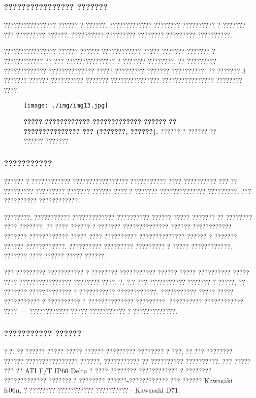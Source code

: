 	\subsubsection {???????????????? ???????}
	
	???????????????? ?????? ? ??????, ????????????? ???????? ?????????? ? ??????? ??? ????????? ??????. ?????????? ????????? ???????? ????????? ??????????.
	
	???????????????? ?????? ?????? ???????????? ????? ??????? ??????? ? ???????????? ?? ??? ??????????????? ? ??????? ????????\cite{makeev}. ?? ????????? ????????????? ?????????????? ????? ????????? ??????? ??????????. ?? ??????? 3 ??????? ?????? ?????????? ??????? ??????????????? ???????????????? ???????? ????.	
	\begin{figure}[ht]
		\centering		 
		\texttt{[image: ./img/img13.jpg]}	
		\caption{
			\textbf{????? ???????????? ????????????? ??????
				?? ??????????????? ??? (???????, ??????).}
			?????? ? ?????? ?? ?????? ???????
		}     
		\label{fig_img13}
	\end{figure}

	\subsubsection{???????????}

	?????? ? ???????????? ????????????????? ??????????? ????
	?????????? ??? ?? ????????? ????????? ??????? ?????? ???? ? ??????? ?????????????? ?????????, ??? ?????????? ????????????.
	
	????????, ??????????? ????????????? ?????????? ?????? ?????
	??????? ?? ???????? ???? ???????. ?? ???? ?????? ? ???????
	?????????????? ?????? ???????????? ??????? ????????????
	????? ???? ?????????? ?????????????? ?????? ? ??????? ??????
	????????????. ?????????? ????????? ????????? ? ????? ????????????, ??????? ???? ?????? ????? ??????.

	??? ????????? ??????????? ? ???????? ??????????? ??????
	????? ?????????? ????? ???? ???????????????? ???????? ????, ?. ?.? 
	??? ??????????? ??????? ? ?????, ?? ??????? ?????????????
	? ??????????? ????????????. ??????????? ????? ????? ??????????? ? ?????????? ? ?????????????? ?????????.
	?????????? ???????????? ????~--- ???????????? ????? ??????????? ? ?????????????.
	
	\newpage
	\subsubsection{??????????? ??????}
	
	?.?. ?? ?????? ????? ????? ?????? ????????? ???????? ? ???, ??
	??? ???????? ?????? ???????????????? ??????, ??????????? ?? ?????????? ??????????. ??? ????? ??? ?? ATI F/T IP60 Delta ? ???? ???????? ???????????? ? ???????? ????????????? ???????.? ???????? ??????-???????????? ??? ?????? Kawasaki fs06n, ? ???????? ??????????? ?????????? - Kawasaki D71.